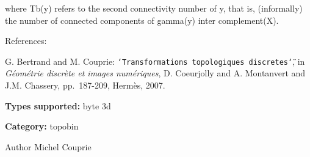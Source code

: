 where Tb(y) refers to the second connectivity number of y, that is, (informally) the number of connected components of gamma(y) inter complement(X).

References:\par
 [BC07] G. Bertrand and M. Couprie: {\tt \char`\"{}Transformations topologiques discretes\char`\"{}}, in {\itshape G\'{e}om\'{e}trie discr\`{e}te et images num\'{e}riques\/}, D. Coeurjolly and A. Montanvert and J.M. Chassery, pp.~187-\/209, Herm\`{e}s, 2007.\par


{\bfseries Types supported:} byte 3d

{\bfseries Category:} topobin

\begin{DoxyAuthor}{Author}
Michel Couprie 
\end{DoxyAuthor}
